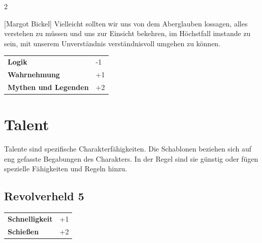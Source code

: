\begin{multicols}{2}
\begin{tcolorbox}
\begin{pquote}{[Margot Bickel]}
Vielleicht sollten wir uns von dem Aberglauben lossagen, alles verstehen zu müssen und uns zur Einsicht bekehren, im Höchstfall imstande zu sein, mit unserem Unverständnis verständnisvoll umgehen zu können.
\end{pquote}

\vspace{3mm}

\begin{tabular}{@{}ll@{}}
    \textbf{Logik} & -1\\
    \textbf{Wahrnehmung} & +1\\
    \textbf{Mythen und Legenden} & +2\\
\end{tabular}


\end{tcolorbox}

\section{Talent}

Talente sind spezifische Charakterfähigkeiten. Die Schablonen beziehen sich auf eng gefasste Begabungen des Charakters. In der Regel sind sie günstig oder fügen spezielle Fähigkeiten und Regeln hinzu.

\begin{tcolorbox}
    \subsection*{Revolverheld \hfill \small{5 }}
    \tcblower




\begin{tabular}{@{}ll@{}}
    \textbf{Schnelligkeit} & +1\\
    \textbf{Schießen} & +2\\
\end{tabular}



\end{tcolorbox}
\end{multicols}
